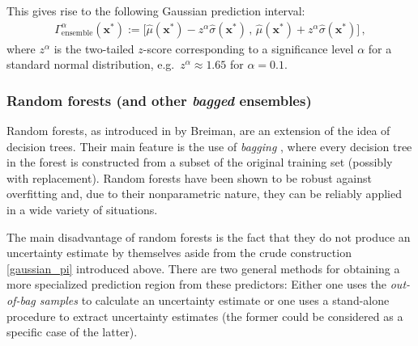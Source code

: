 \documentclass[smallcondensed]{svjour3}
\begin{document}
    This gives rise to the following Gaussian prediction interval:
    \begin{gather}
        \label{gaussian_pi}
        \Gamma^\alpha_\text{ensemble}(\mathbf{x}^*) := \big[\hat{\mu}(\mathbf{x}^*) - z^\alpha\hat{\sigma}(\mathbf{x}^*)\,,\,\hat{\mu}(\mathbf{x}^*) + z^\alpha\hat{\sigma}(\mathbf{x}^*)\big]\,,
    \end{gather}
    where $z^\alpha$ is the two-tailed $z$-score corresponding to a significance level $\alpha$ for a standard normal distribution, e.g.\ $z^\alpha\approx 1.65$ for $\alpha=0.1$.

\subsubsection*{Random forests (and other \textit{bagged} ensembles)}

    Random forests, as introduced in \cite{breiman2001random} by Breiman, are an extension of the idea of decision trees. Their main feature is the use of \textit{bagging} \cite{breiman1996bagging}, where every decision tree in the forest is constructed from a subset of the original training set (possibly with replacement). Random forests have been shown to be robust against overfitting and, due to their nonparametric nature, they can be reliably applied in a wide variety of situations.

    The main disadvantage of random forests is the fact that they do not produce an uncertainty estimate by themselves aside from the crude construction \eqref{gaussian_pi} introduced above. There are two general methods for obtaining a more specialized prediction region from these predictors: Either one uses the \textit{out-of-bag samples} to calculate an uncertainty estimate or one uses a stand-alone procedure to extract uncertainty estimates (the former could be considered as a specific case of the latter).
\end{document}
